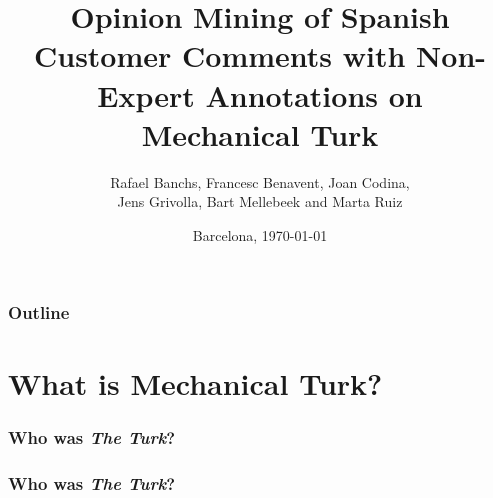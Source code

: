 \documentclass[10pt]{beamer}
\title{Opinion Mining of Spanish Customer Comments with Non-Expert Annotations on\\ Mechanical Turk}
\author{Rafael Banchs, Francesc Benavent, Joan Codina, \\ Jens Grivolla, Bart Mellebeek and Marta Ruiz}
\institute
{
  Barcelona Media Centre d'Innovacio\\ \vspace{.2cm}
  \pgfuseimage{bmlogo}
}
\date{Barcelona, \today}
\begin{document}
\frame{\titlepage}

\begin{frame}
  \frametitle{Outline}
  \tableofcontents
\end{frame}

\section{What is Mechanical Turk?}

\begin{frame}
  \frametitle{Who was \textit{The Turk}?}
  \begin{center}
  \end{center}
\end{frame}

\begin{frame}
  \frametitle{Who was \textit{The Turk}?}
  \begin{center}
  \end{center}
\end{frame}
\end{document}
